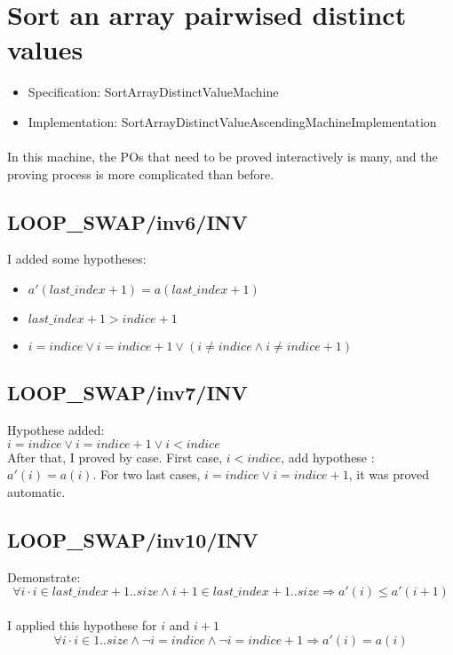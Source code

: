 \section{Sort an array pairwised distinct values}

\begin{itemize}
\item Specification: SortArrayDistinctValueMachine
\item Implementation: SortArrayDistinctValueAscendingMachineImplementation
\end{itemize}

\paragraph{}
In this machine, the POs that need to be proved interactively is many, and the proving process is more complicated than before.

\subsection{LOOP\_SWAP/inv6/INV}
I added some hypotheses:
\begin{itemize}
\item $a'(last\_index+1) = a(last\_index+1)$
\item $last\_index +1 > indice+1$
\item $i=indice \lor i=indice+1 \lor (i \neq indice \land i \neq indice+1)$
\end{itemize} 

\subsection{LOOP\_SWAP/inv7/INV}
Hypothese added:\\
$i=indice \lor i=indice+1 \lor i < indice$\\
After that, I proved by case. First case, $i < indice$, add hypothese : $a'(i) = a(i)$. For two last cases, $i = indice \lor i=indice+1$, it was proved automatic.

\subsection{LOOP\_SWAP/inv10/INV}
Demonstrate:
$$
\forall i \cdot i \in last\_index+1..size \land i+1 \in last\_index+1..size \Rightarrow a'(i) \leq a'(i+1)
$$
\paragraph{}
I applied this hypothese for $i$ and $i+1$
$$
\forall i \cdot i \in 1..size \land \neg i=indice \land \neg i=indice+1\Rightarrow a'(i)=a(i)
$$
